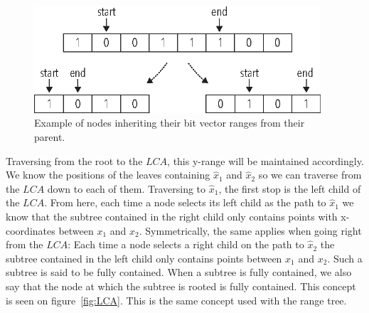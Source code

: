 \begin{figure}[h]
    \centering
    \includegraphics[width=0.95\textwidth]{pictures/bit_vector_split3.eps}
    \caption{Example of nodes inheriting their bit vector ranges from their parent.}
    \label{fig:bitvectorsplit}
\end{figure}

Traversing from the root to the $LCA$, this y-range will be maintained accordingly. We know the positions of the leaves containing $\hat{x}_1$ and $\hat{x}_2$ so we can traverse from the $LCA$ down to each of them. Traversing to $\hat{x}_1$, the first stop is the left child of the $LCA$. From here, each time a node selects its left child as the path to $\hat{x}_1$ we know that the subtree contained in the right child only contains points with x-coordinates between $x_1$ and $x_2$. Symmetrically, the same applies when going right from the $LCA$: Each time a node selects a right child on the path to $\hat{x}_2$ the subtree contained in the left child only contains points between $x_1$ and $x_2$. Such a subtree is said to be fully contained. When a subtree is fully contained, we also say that the node at which the subtree is rooted is fully contained. This concept is seen on figure~\ref{fig:LCA}. This is the same concept used with the range tree. \\

